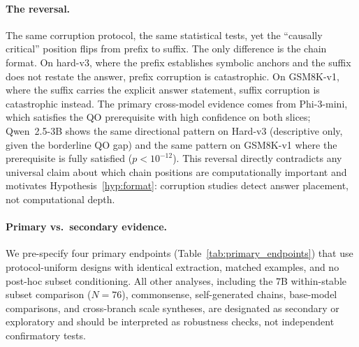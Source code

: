 \documentclass{article}
\theoremstyle{definition}
\theoremstyle{definition}
\begin{document}
\paragraph{The reversal.}
The same corruption protocol, the same statistical tests, yet
the ``causally critical'' position flips from prefix to suffix. The only
difference is the chain format. On hard-v3, where the prefix establishes
symbolic anchors and the suffix does not restate the answer, prefix
corruption is catastrophic. On GSM8K-v1, where the suffix carries the
explicit answer statement, suffix corruption is catastrophic instead.
The primary cross-model evidence comes from Phi-3-mini, which satisfies
the QO prerequisite with high confidence on both slices; Qwen~2.5-3B
shows the same directional pattern on Hard-v3 (descriptive only, given
the borderline QO gap) and the same pattern on GSM8K-v1 where the
prerequisite is fully satisfied ($p < 10^{-12}$).
This reversal directly contradicts any universal claim about
which chain positions are computationally important and motivates
Hypothesis~\ref{hyp:format}: corruption studies detect answer placement,
not computational depth.

\paragraph{Primary vs.\ secondary evidence.}
We pre-specify four primary endpoints (Table~\ref{tab:primary_endpoints})
that use protocol-uniform designs with identical extraction, matched examples,
and no post-hoc subset conditioning. All other analyses, including the 7B
within-stable subset comparison ($N{=}76$), commonsense, self-generated chains,
base-model comparisons, and cross-branch scale syntheses, are designated as
secondary or exploratory and should be interpreted as robustness checks, not
independent confirmatory tests.
\end{document}
